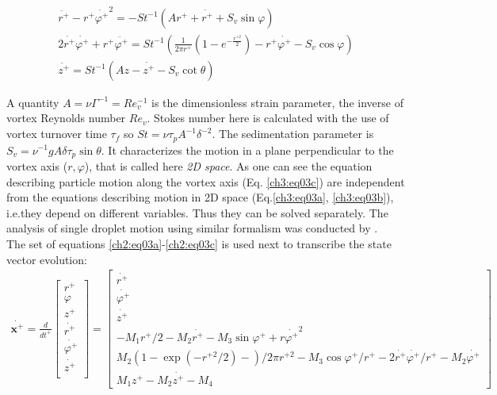 \documentclass[../main.tex]{subfiles}
\begin{document}
\begin{align}
\ddot{r^+}-r^+\dot{\varphi^+}^2=-St^{-1}\left(A r^++\dot{r^+}+S_v \sin\varphi\right) \label{ch2:eq03a} \\
2\dot{r^+}\dot{\varphi^+}+r^+\ddot{\varphi^+}=St^{-1}\left(\frac{1}{2 \pi r^+}(1-e^{-\frac{r^{+ 2}}{2}})-r^+\dot{\varphi^+}-S_v\cos\varphi\right) \label{ch2:eq03b} \\
\ddot{z^+}=St^{-1}\left(A z - \dot{z^+} - S_v \cot\theta\right) \label{ch2:eq03c}
\end{align}

\noindent A quantity $A=\nu \Gamma^{-1}=Re_v^{-1}$ is the dimensionless strain parameter, the inverse of vortex Reynolds number $Re_v$. Stokes number here is calculated with the use of vortex turnover time $\tau_f$ so $St=\nu \tau_p A^{-1} \delta^{-2}$. The sedimentation parameter is $S_v=\nu^{-1} g A \delta \tau_p \sin\theta $. It characterizes the motion in a plane perpendicular to the vortex axis ($r,\varphi$), that is called here \emph{2D space}. As one can see the equation describing particle motion along the vortex axis (Eq. \ref{ch3:eq03c}) are independent from the equations describing motion in 2D space (Eq.\ref{ch3:eq03a}, \ref{ch3:eq03b}), i.e.they depend on different variables. Thus they can be solved separately. The analysis of single droplet motion using similar formalism was conducted by \citet{Marcu1995}.\\
The set of equations \ref{ch2:eq03a}-\ref{ch2:eq03c} is used next to transcribe the state vector evolution:
\begin{gather}
\dot{\mathbf{x^+}}=\frac{d}{dt^+}
\begin{bmatrix} r^+\\ \varphi\\ z^+\\ \dot{r^+}\\ \dot{\varphi^+}\\ \dot{z^+}\\
\end{bmatrix}
=
\begin{bmatrix} \dot{r^+} \\\dot{\varphi^+}\\ \dot{z^+} \\ 
-M_1 r^+/2-M_2 \dot{r^+} -M_3 \sin{\varphi^+}+r\dot{\varphi^+}^2 \\
M_2\left( 1-\exp(-r^{+ 2}/2)-\right)/2 \pi r^{+ 2}-M_3 \cos{\varphi^+}/r^+ -2\dot{r^+}\dot{\varphi^+}/r^+-M_2\dot{\varphi^+}\\
M_1 z^+-M_2 \dot{z^+} - M_4
\end{bmatrix}
\label{ch02:eq04}
\end{gather}
\end{document}
